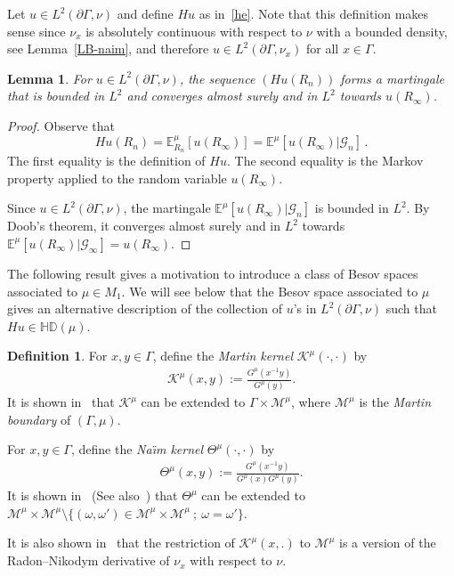 \documentclass[10pt]{amsart}
\newtheorem{lemm}[theo]{Lemma}\newtheorem{prop}[theo]{Proposition}\newtheorem{coro}[theo]{Corollary}\newtheorem{conj}[theo]{Conjecture}
\theoremstyle{definition}\newtheorem{defi}[theo]{Definition}\newtheorem{rema}[theo]{Remark}\newtheorem{exam}[theo]{Example}\newtheorem{exem}[theo]{Example}\newtheorem{nota}[theo]{Notation}
\newcommand{\cm}{\mathcal{M}}
\newcommand{\ck}{\mathcal{K}}
\newcommand{\cG}{\mathcal{G}}
\newcommand{\be}{\mathbb{E}}
\newcommand{\bHD}{\mathbb{HD}}
\begin{document}
Let $u\in L^2(\partial\Gamma,\nu)$ and define $Hu$ as in~\eqref{he}. Note that this definition makes sense since $\nu_x$ is absolutely continuous with respect to $\nu$ with a bounded density, see Lemma~\ref{LB-naim}, and therefore $u\in L^2(\partial\Gamma,\nu_x)$ for all $x\in\Gamma$.

\begin{lemm}\label{harm-ext}
For $u\in L^2(\partial\Gamma,\nu)$, the sequence $(Hu(R_n))$ forms a martingale that is bounded in $L^2$ and converges almost surely and in $L^2$ towards $u(R_\infty)$.
\end{lemm}
\begin{proof}
Observe that
\begin{equation}\label{eq:he}
Hu(R_n)=\be^\mu_{R_n}[u(R_\infty)]=\be^\mu[u(R_\infty)\vert\cG_n]\,.
\end{equation}
The first equality is the definition of $Hu$. The second equality is the Markov property applied to the random variable $u(R_\infty)$.

Since $u\in L^2(\partial\Gamma,\nu)$, the martingale $\be^\mu[u(R_\infty)\vert\cG_n]$ is bounded in $L^2$. By Doob's theorem, it converges almost surely and in $L^2$ towards $\be^\mu[u(R_\infty)\vert\cG_\infty]=u(R_\infty)$.
\end{proof}



The following result gives a motivation to introduce a class of Besov spaces associated to $\mu\in M_1$. We will see below that the Besov space associated to $\mu$ gives an alternative description of the collection of $u$'s in $L^2(\partial\Gamma,\nu)$ such that $Hu\in\bHD(\mu)$.

\begin{defi}\label{naim kernel}
For $x,y\in\Gamma$, define the \emph{Martin kernel} $\ck^{\mu}(\cdot,\cdot)$ by
\begin{align*}
\ck^{\mu}(x,y):=\frac{G^{\mu}\left(x^{-1}y\right)}{G^{\mu}(y)}.
\end{align*}
It is shown in~\cite{Dyn} that $ \ck^{\mu}$ can be extended to $\Gamma\times\cm^{\mu}$, where $\cm^{\mu}$ is the \emph{Martin boundary} of $(\Gamma,\mu)$.

For $x,y\in\Gamma$, define the \emph{Na{\"\i}m kernel} $\Theta^{\mu}(\cdot,\cdot)$ by
\begin{align*}
\Theta^{\mu}(x,y):=\frac{G^{\mu}\left(x^{-1}y\right)}{G^{\mu}(x)G^{\mu}(y)}.
\end{align*}
It is shown in~\cite{Sil} (See also~\cite{Na}) that $\Theta^{\mu}$ can be extended to $\cm^{\mu}\times\cm^{\mu}
\setminus\{(\omega,\omega')\in\cm^{\mu}\times\cm^{\mu}\ ;\ \omega=\omega'\}$.

It is also shown in~\cite{Dyn} that the restriction of $\ck^\mu(x,.)$ to $\cm^{\mu}$ is a version of the Radon--Nikodym derivative of $\nu_x$ with respect to $\nu$.
\end{defi}
\end{document}
